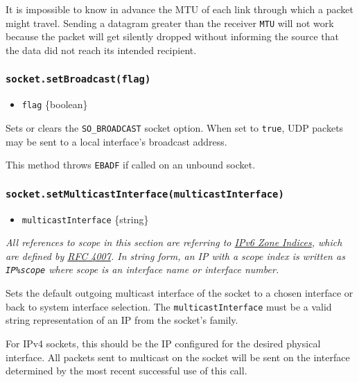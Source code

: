 It is impossible to know in advance the MTU of each link through which a
packet might travel. Sending a datagram greater than the receiver
\texttt{MTU} will not work because the packet will get silently dropped
without informing the source that the data did not reach its intended
recipient.

\subsubsection{\texorpdfstring{\texttt{socket.setBroadcast(flag)}}{socket.setBroadcast(flag)}}\label{socket.setbroadcastflag}

\begin{itemize}
\tightlist
\item
  \texttt{flag} \{boolean\}
\end{itemize}

Sets or clears the \texttt{SO\_BROADCAST} socket option. When set to
\texttt{true}, UDP packets may be sent to a local interface's broadcast
address.

This method throws \texttt{EBADF} if called on an unbound socket.

\subsubsection{\texorpdfstring{\texttt{socket.setMulticastInterface(multicastInterface)}}{socket.setMulticastInterface(multicastInterface)}}\label{socket.setmulticastinterfacemulticastinterface}

\begin{itemize}
\tightlist
\item
  \texttt{multicastInterface} \{string\}
\end{itemize}

\emph{All references to scope in this section are referring to
\href{https://en.wikipedia.org/wiki/IPv6_address\#Scoped_literal_IPv6_addresses}{IPv6
Zone Indices}, which are defined by
\href{https://tools.ietf.org/html/rfc4007}{RFC 4007}. In string form, an
IP with a scope index is written as
\texttt{\textquotesingle{}IP\%scope\textquotesingle{}} where scope is an
interface name or interface number.}

Sets the default outgoing multicast interface of the socket to a chosen
interface or back to system interface selection. The
\texttt{multicastInterface} must be a valid string representation of an
IP from the socket's family.

For IPv4 sockets, this should be the IP configured for the desired
physical interface. All packets sent to multicast on the socket will be
sent on the interface determined by the most recent successful use of
this call.

